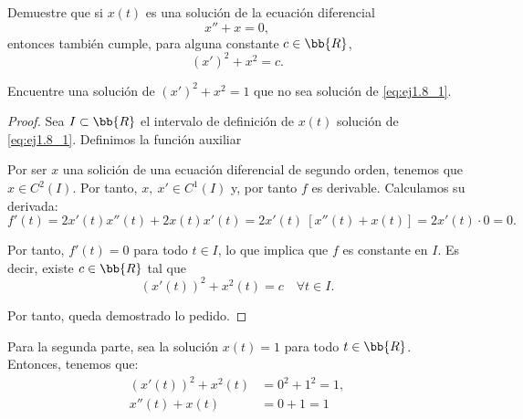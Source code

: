 \begin{ejercicio}
    Demuestre que si \(x(t)\) es una solución de la ecuación diferencial
    \begin{equation}\label{eq:ej1.8_1}
        x'' + x = 0,
    \end{equation}
    entonces también cumple, para alguna constante \(c \in \bb{R}\),
    \begin{equation}\label{eq:ej1.8_2}
        (x')^2 + x^2 = c.
    \end{equation}

    Encuentre una solución de $(x')^2 + x^2 = 1$ que no sea solución de \eqref{eq:ej1.8_1}.\\

    \begin{proof}
        Sea $I\subset \bb{R}$ el intervalo de definición de $x(t)$ solución de \eqref{eq:ej1.8_1}. Definimos la función auxiliar

        Por ser $x$ una solición de una ecuación diferencial de segundo orden, tenemos que $x\in C^2(I)$. Por tanto, $x,~x'\in C^1(I)$ y, por tanto $f$ es derivable. Calculamos su derivada:
        \begin{equation*}
            f'(t) = 2x'(t)x''(t) + 2x(t)x'(t) = 2x'(t)~\left[ x''(t) + x(t) \right] = 2x'(t)\cdot 0 = 0.
        \end{equation*}

        Por tanto, $f'(t)=0$ para todo $t\in I$, lo que implica que $f$ es constante en $I$. Es decir, existe $c\in \bb{R}$ tal que
        \begin{equation*}
            (x'(t))^2 + x^2(t) = c \quad \forall t\in I.
        \end{equation*}

        Por tanto, queda demostrado lo pedido.
    \end{proof}

    Para la segunda parte, sea la solución $x(t) = 1$ para todo $t\in \bb{R}$. Entonces, tenemos que:
    \begin{align*}
        (x'(t))^2 + x^2(t) &= 0^2 + 1^2 = 1,\\
        x''(t) + x(t) &= 0 + 1 = 1
    \end{align*}
\end{ejercicio}
